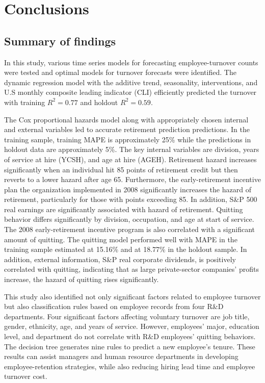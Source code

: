 \chapter{Conclusions} \label{ch:conclusion}
\section{Summary of findings}
In this study, various time series models for forecasting employee-turnover counts were tested and optimal models for turnover forecasts were identified. The dynamic regression model with the additive trend, seasonality, interventions, and U.S monthly composite leading indicator (CLI) efficiently predicted the turnover with training $R^2=0.77$ and holdout $R^2=0.59$. 

The Cox proportional hazards model along with appropriately chosen internal and external variables led to accurate retirement prediction predictions. In the training sample, training MAPE is approximately 25\% while the predictions in holdout data are approximately 5\%. The key internal variables are division, years of service at hire (YCSH), and age at hire (AGEH). Retirement hazard increases significantly when an individual hit 85 points of retirement credit but then reverts to a lower hazard after age 65. Furthermore, the early-retirement incentive plan the organization implemented in 2008 significantly increases the hazard of retirement, particularly for those with points exceeding 85. In addition, S\&P 500 real earnings are significantly associated with hazard of retirement. Quitting behavior differs significantly by division, occupation, and age at start of service. The 2008 early-retirement incentive program is also correlated with a significant amount of quitting. The quitting model performed well with MAPE in the training sample estimated at 15.16\% and at 18.77\% in the holdout sample. In addition, external information, S\&P real corporate dividends, is positively correlated with quitting, indicating that as large private-sector companies' profits increase, the hazard of quitting rises significantly.

This study also identified not only significant factors related to employee turnover but also classification rules based on employee records from four R\&D departments. Four significant factors affecting voluntary turnover are job title, gender, ethnicity, age, and years of service. However, employees' major, education level, and department do not correlate with R\&D employees' quitting behaviors. The decision tree generates nine rules to predict a new employee's tenure. These results can assist managers and human resource departments in developing employee-retention strategies, while also reducing hiring lead time and employee turnover cost.  

